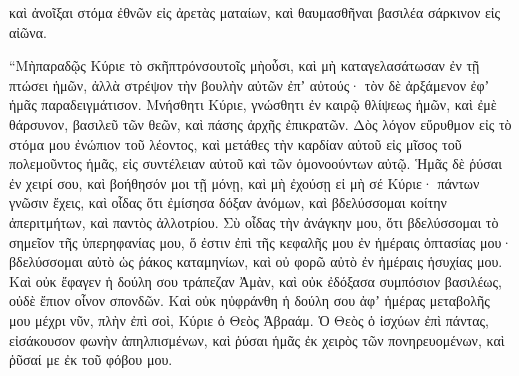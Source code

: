 {καὶ ἀνοῖξαι στόμα ἐθνῶν εἰς ἀρετὰς ματαίων, καὶ θαυμασθῆναι βασιλέα σάρκινον εἰς αἰῶνα.
\par }{\PP {}“Μὴπαραδῷς Κύριε τὸ σκῆπτρόνσουτοῖς μὴοὖσι, καὶ μὴ καταγελασάτωσαν ἐν τῇ πτώσει ἡμῶν, ἀλλὰ στρέψον τὴν βουλὴν αὐτῶν ἐπʼ αὐτούς· τὸν δὲ ἀρξάμενον ἐφʼ ἡμᾶς παραδειγμάτισον.
Μνήσθητι Κύριε, γνώσθητι ἐν καιρῷ θλίψεως ἡμῶν, καὶ ἐμὲ θάρσυνον, βασιλεῦ τῶν θεῶν, καὶ πάσης ἀρχῆς ἐπικρατῶν.
Δὸς λόγον εὔρυθμον εἰς τὸ στόμα μου ἐνώπιον τοῦ λέοντος, καὶ μετάθες τὴν καρδίαν αὐτοῦ εἰς μῖσος τοῦ πολεμοῦντος ἡμᾶς, εἰς συντέλειαν αὐτοῦ καὶ τῶν ὁμονοούντων αὐτῷ.
Ἡμᾶς δὲ ῥύσαι ἐν χειρί σου, καὶ βοήθησόν μοι τῇ μόνῃ, καὶ μὴ ἐχούσῃ εἰ μὴ σέ Κύριε·
πάντων γνῶσιν ἔχεις, καὶ οἶδας ὅτι ἐμίσησα δόξαν ἀνόμων, καὶ βδελύσσομαι κοίτην ἀπεριτμήτων, καὶ παντὸς ἀλλοτρίου.
Σὺ οἶδας τὴν ἀνάγκην μου, ὅτι βδελύσσομαι τὸ σημεῖον τῆς ὑπερηφανίας μου, ὅ ἐστιν ἐπὶ τῆς κεφαλῆς μου ἐν ἡμέραις ὁπτασίας μου· βδελύσσομαι αὐτὸ ὡς ῥάκος καταμηνίων, καὶ οὐ φορῶ αὐτὸ ἐν ἡμέραις ἡσυχίας μου.
Καὶ οὐκ ἔφαγεν ἡ δούλη σου τράπεζαν Ἀμὰν, καὶ οὐκ ἐδόξασα συμπόσιον βασιλέως, οὐδὲ ἔπιον οἶνον σπονδῶν.
Καὶ οὐκ ηὐφράνθη ἡ δούλη σου ἀφʼ ἡμέρας μεταβολῆς μου μέχρι νῦν, πλὴν ἐπὶ σοὶ, Κύριε ὁ Θεὸς Ἁβραάμ.
Ὁ Θεὸς ὁ ἰσχύων ἐπὶ πάντας, εἰσάκουσον φωνὴν ἀπηλπισμένων, καὶ ῥύσαι ἡμᾶς ἐκ χειρὸς τῶν πονηρευομένων, καὶ ῥῦσαί με ἐκ τοῦ φόβου μου.

}
